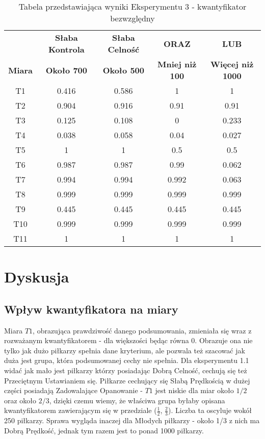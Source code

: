 \documentclass{classrep}
\begin{document}
\begin{table}[H]
	\centering
	\begin{tabular}{c c c c c } 
		\hline
		& \textbf{Słaba Kontrola} & \textbf{Słaba Celność} & \textbf{ORAZ} & \textbf{LUB}\\ [0.5ex] 
		\textbf{Miara} & \textbf{Około 700} & \textbf{Około 500} & \textbf{Mniej niż 100} & \textbf{Więcej niż 1000}\\ [0.5ex] 
		\hline
		\hline 
		T1 & 0.416 & 0.586 & 1 & 1 \\
		T2 & 0.904 & 0.916 & 0.91 & 0.91 \\
		T3 & 0.125 & 0.108 & 0 & 0.233 \\
		T4 & 0.038 & 0.058 & 0.04 & 0.027 \\
		T5 & 1 & 1 & 0.5 & 0.5 \\
		T6 & 0.987 & 0.987 & 0.99 & 0.062 \\
		T7 & 0.994 & 0.994 & 0.992 & 0.063 \\
		T8 & 0.999 & 0.999 & 0.999 & 0.999 \\
		T9 & 0.445 & 0.445 & 0.445 & 0.445 \\
		T10 & 0.999 & 0.999 & 0.999 & 0.999 \\
		T11 & 1 & 1 & 1 & 1 \\
		\hline
	\end{tabular}
	\caption{Tabela przedstawiająca wyniki Eksperymentu 3 - kwantyfikator bezwzględny}
\end{table}

\section{Dyskusja}

\subsection{Wpływ kwantyfikatora na miary}

Miara $T1$, obrazująca prawdziwość danego podsumowania, zmieniała się wraz z rozważanym kwantyfikatorem - dla większości będąc równa 0. Obrazuje ona nie tylko jak dużo piłkarzy spełnia dane kryterium, ale pozwala też szacować jak duża jest grupa, która podsumowanej cechy nie spełnia. Dla eksperymentu 1.1 widać jak mało jest piłkarzy którzy posiadając Dobrą Celność, cechują się też Przeciętnym Ustawianiem się. Piłkarze cechujący się Słabą Prędkością w dużej części posiadają Zadowalające Opanowanie - $T1$ jest niskie dla miar około $1/2$ oraz około $2/3$, dzięki czemu wiemy, że właściwa grupa byłaby opisana kwantyfikatorem zawierającym się w przedziale ($\frac{1}{2}$, $\frac{2}{3}$). Liczba ta oscyluje wokół 250 piłkarzy. Sprawa wygląda inaczej dla Młodych piłkarzy - około 1/3 z nich ma Dobrą Prędkość, jednak tym razem jest to ponad 1000 piłkarzy. 
\newline
\end{document}
